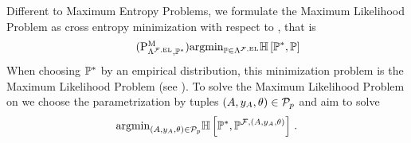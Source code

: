 
Different to Maximum Entropy Problems, we formulate the Maximum Likelihood Problem as cross entropy minimization with respect to \HybridLogicNetworks{}, that is
\begin{align}
    \label{prob:minCrossEntropyHLN}\tag{$\probtagtypeinst{\mprojectionsymbol}{\elrealizabledistsof{\hlnstat},\gendistribution}$}
    \argmin_{\probtensor\in\elrealizabledistsof{\hlnstat}} \centropyof{\gendistribution}{\probtensor}
\end{align}
When choosing $\mathbb{P}^*$ by an empirical distribution, this minimization problem is the Maximum Likelihood Problem (see ).
To solve the Maximum Likelihood Problem on \HybridLogicNetworks{} we choose the parametrization by tuples $(A,y_{A},\theta)\in\mathcal{P}_{p}$ and aim to solve
\begin{align*}
    \mathrm{argmin}_{(A,y_{A},\theta)\in\mathcal{P}_{p}} \mathbb{H}\left[\mathbb{P}^*,\mathbb{P}^{\mathcal{F},(A,y_{A},\theta)}\right] \, .
\end{align*}



